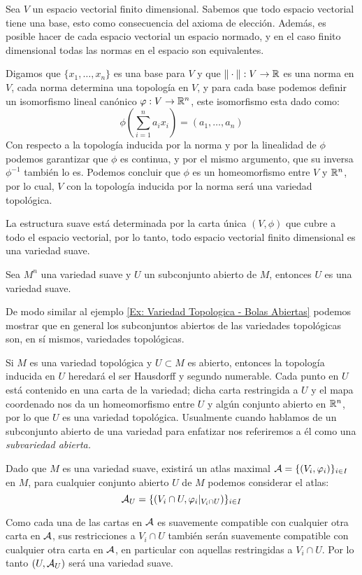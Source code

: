 \begin{example}\label{Ex: Variedad Sauve - Espacios Vectoriales}
  Sea $V$ un espacio vectorial finito dimensional. Sabemos que todo espacio vectorial tiene una base, esto como consecuencia del axioma de elección. Además, es posible hacer de cada espacio vectorial un espacio normado, y en el caso finito dimensional todas las normas en el espacio son equivalentes.

  Digamos que $\{x_1, \ldots, x_n\}$ es una base para $V$ y que $\| \cdot \|: V \to \mathbb{R}$ es una norma en $V$, cada norma determina una topología en $V$, y para cada base podemos definir un isomorfismo lineal canónico $\varphi: V \to \mathbb{R}^n$, este isomorfismo esta dado como:
  \[
    \phi\left( \sum_{i=1}^{n} a_i x_i\right) = (a_1, \ldots, a_n)
  \]
  Con respecto a la topología inducida por la norma y por la linealidad de $\phi$ podemos garantizar que $\phi$ es continua, y por el mismo argumento, que su inversa $\phi^{-1}$ también lo es. Podemos concluir que $\phi$ es un homeomorfismo entre $V$ y $\mathbb{R}^n$, por lo cual, $V$ con la topología inducida por la norma será una variedad topológica.

  La estructura suave está determinada por la carta única $(V, \phi)$ que cubre a todo el espacio vectorial, por lo tanto, todo espacio vectorial finito dimensional es una variedad suave.
\end{example}

\begin{example}\label{Ex: Variedad Suave - Subvariedades Suaves}
	Sea $M^n$ una variedad suave y $U$ un subconjunto abierto de $M$, entonces $U$ es una variedad suave.

	De modo similar al ejemplo \ref{Ex: Variedad Topologica - Bolas Abiertas} podemos mostrar que en general los subconjuntos abiertos de las variedades topológicas son, en sí mismos, variedades topológicas.

	Si $M$ es una variedad topológica y $U \subset M$ es abierto, entonces la topología inducida en $U$ heredará el ser Hausdorff y segundo numerable. Cada punto en $U$ está contenido en una carta de la variedad; dicha carta restringida a $U$ y el mapa coordenado nos da un homeomorfismo entre $U$ y algún conjunto abierto en $\mathbb{R}^n$, por lo que $U$ es una variedad topológica. Usualmente cuando hablamos de un subconjunto abierto de una variedad para enfatizar nos referiremos a él como una \it{subvariedad abierta}.

	Dado que $M$ es una variedad suave, existirá un atlas maximal $\mathcal{A} = \{(V_i,\varphi_i) \}_{i \in I}$ en $M$, para cualquier conjunto abierto $U$ de $M$ podemos considerar el atlas:
	\[ \mathcal{A}_U = \{(V_i \cap U, \varphi_i |_{V_i \cap U})\}_{i \in I} \]

	Como cada una de las cartas en $\mathcal{A}$ es suavemente compatible con cualquier otra carta en $\mathcal{A}$, sus restricciones a $V_i \cap U$ también serán suavemente compatible con cualquier otra carta en $\mathcal{A}$, en particular con aquellas restringidas a $V_i \cap U$. Por lo tanto $(U, \mathcal{A}_U)$ será una variedad suave.
\end{example}

